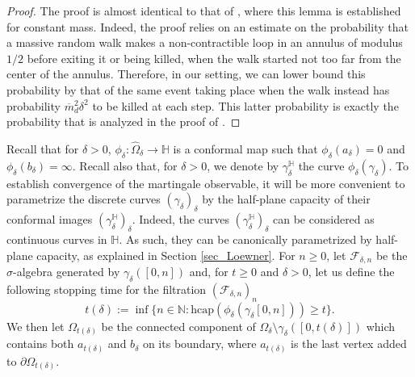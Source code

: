 \documentclass{article}
\newcommand{\HH}{{\mathbb{H}}}
\theoremstyle{definition}
\theoremstyle{remark}
\theoremstyle{remark}
\begin{document}
\begin{proof}
The proof is almost identical to that of \cite[Lemma~3.4]{off_dimers}, where this lemma is established for constant mass. Indeed, the proof relies on an estimate on the probability that a massive random walk makes a non-contractible loop in an annulus of modulus $1/2$ before exiting it or being killed, when the walk started not too far from the center of the annulus. Therefore, in our setting, we can lower bound this probability by that of the same event taking place when the walk instead has probability $\overline{m}^2_d \delta^2$ to be killed at each step. This latter probability is exactly the probability that is analyzed in the proof of \cite[Lemma~3.4]{off_dimers}.
\end{proof}

Recall that for $\delta > 0$, $\phi_{\delta}: \hat \Omega_{\delta} \to \HH$ is a conformal map such that $\phi_{\delta}(a_{\delta})=0$ and $\phi_{\delta}(b_{\delta})=\infty$. Recall also that, for $\delta > 0$, we denote by $\gamma_{\delta}^{\HH}$ the curve $\phi_{\delta}(\gamma_{\delta})$. To establish convergence of the martingale observable, it will be more convenient to parametrize the discrete curves $(\gamma_{\delta})_{\delta}$ by the half-plane capacity of their conformal images $(\gamma_{\delta}^{\HH})_{\delta}$. Indeed, the curves $(\gamma_{\delta}^{\HH})_{\delta}$ can be considered as continuous curves in $\HH$. As such, they can be canonically parametrized by half-plane capacity, as explained in Section \ref{sec_Loewner}. For $n \geq 0$, let $\mathcal{F}_{\delta,n}$ be the $\sigma$-algebra generated by $\gamma_{\delta}([0,n])$ and, for $t \geq 0$ and $\delta >0$, let us define the following stopping time for the filtration $(\mathcal{F}_{\delta, n})_n$
\begin{equation*}
    t(\delta) := \inf \{ n \in \mathbb{N}: \text{hcap}(\phi_{\delta}(\gamma_{\delta}[0,n])) \geq t \}.
\end{equation*}
We then let $\Omega_{t(\delta)}$ be the connected component of $\Omega_{\delta} \setminus \gamma_{\delta}([0,t(\delta)])$ which contains both $a_{t(\delta)}$ and $b_{\delta}$ on its boundary, where $a_{t(\delta)}$ is the last vertex added to $\partial \Omega_{t(\delta)}$.
\end{document}
